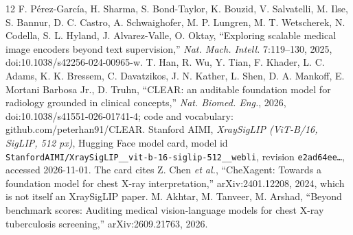 \documentclass[11pt,a4paper]{article}
\newcommand{\code}[1]{\texttt{#1}}
\begin{document}
\begin{thebibliography}{12}
 F. P\'erez-Garc\'ia, H. Sharma, S. Bond-Taylor, K. Bouzid, V. Salvatelli, M. Ilse, S. Bannur, D. C. Castro, A. Schwaighofer, M. P. Lungren, M. T. Wetscherek, N. Codella, S. L. Hyland, J. Alvarez-Valle, O. Oktay, ``Exploring scalable medical image encoders beyond text supervision,'' \emph{Nat. Mach. Intell.} 7:119--130, 2025, doi:10.1038/s42256-024-00965-w.
 T. Han, R. Wu, Y. Tian, F. Khader, L. C. Adams, K. K. Bressem, C. Davatzikos, J. N. Kather, L. Shen, D. A. Mankoff, E. Mortani Barbosa Jr., D. Truhn, ``CLEAR: an auditable foundation model for radiology grounded in clinical concepts,'' \emph{Nat. Biomed. Eng.}, 2026, doi:10.1038/s41551-026-01741-4; code and vocabulary: github.com/peterhan91/CLEAR.
 Stanford AIMI, \emph{XraySigLIP (ViT-B/16, SigLIP, 512 px)}, Hugging Face model card, model id \code{StanfordAIMI/XraySigLIP\_\_vit-b-16-siglip-512\_\_webli}, revision \code{e2ad64ee\ldots}, accessed 2026-11-01. The card cites Z. Chen \emph{et al.}, ``CheXagent: Towards a foundation model for chest X-ray interpretation,'' arXiv:2401.12208, 2024, which is not itself an XraySigLIP paper.
 M. Akhtar, M. Tanveer, M. Arshad, ``Beyond benchmark scores: Auditing medical vision-language models for chest X-ray tuberculosis screening,'' arXiv:2609.21763, 2026.
\end{thebibliography}
\end{document}
